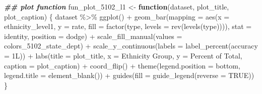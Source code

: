 \documentclass[
]{article}
\newenvironment{Shaded}{\begin{snugshade}}{\end{snugshade}}
\newcommand{\AttributeTok}[1]{\textcolor[rgb]{0.77,0.63,0.00}{#1}}
\newcommand{\ConstantTok}[1]{\textcolor[rgb]{0.00,0.00,0.00}{#1}}
\newcommand{\ControlFlowTok}[1]{\textcolor[rgb]{0.13,0.29,0.53}{\textbf{#1}}}
\newcommand{\DocumentationTok}[1]{\textcolor[rgb]{0.56,0.35,0.01}{\textbf{\textit{#1}}}}
\newcommand{\FunctionTok}[1]{\textcolor[rgb]{0.00,0.00,0.00}{#1}}
\newcommand{\NormalTok}[1]{#1}
\newcommand{\OtherTok}[1]{\textcolor[rgb]{0.56,0.35,0.01}{#1}}
\newcommand{\SpecialCharTok}[1]{\textcolor[rgb]{0.00,0.00,0.00}{#1}}
\newcommand{\StringTok}[1]{\textcolor[rgb]{0.31,0.60,0.02}{#1}}
\begin{document}
\begin{Shaded}
\begin{Highlighting}[]
\DocumentationTok{\#\# plot function}
\NormalTok{fun\_plot\_5102\_l1 }\OtherTok{\textless{}{-}} \ControlFlowTok{function}\NormalTok{(dataset, plot\_title, plot\_caption) \{}
\NormalTok{    dataset }\SpecialCharTok{\%\textgreater{}\%} 
        \FunctionTok{ggplot}\NormalTok{() }\SpecialCharTok{+}
        \FunctionTok{geom\_bar}\NormalTok{(}\AttributeTok{mapping =} \FunctionTok{aes}\NormalTok{(}\AttributeTok{x =}\NormalTok{ ethnicity\_level1, }
                               \AttributeTok{y =}\NormalTok{ rate, }
                               \AttributeTok{fill =} \FunctionTok{factor}\NormalTok{(type, }\AttributeTok{levels =} \FunctionTok{rev}\NormalTok{(}\FunctionTok{levels}\NormalTok{(type)))), }
                 \AttributeTok{stat =} \StringTok{\textquotesingle{}identity\textquotesingle{}}\NormalTok{, }
                 \AttributeTok{position =} \StringTok{\textquotesingle{}dodge\textquotesingle{}}\NormalTok{) }\SpecialCharTok{+}
        \FunctionTok{scale\_fill\_manual}\NormalTok{(}\AttributeTok{values =}\NormalTok{ colors\_5102\_state\_dept) }\SpecialCharTok{+}
        \FunctionTok{scale\_y\_continuous}\NormalTok{(}\AttributeTok{labels =} \FunctionTok{label\_percent}\NormalTok{(}\AttributeTok{accuracy =}\NormalTok{ 1L)) }\SpecialCharTok{+}
        \FunctionTok{labs}\NormalTok{(}\AttributeTok{title =}\NormalTok{ plot\_title,}
             \AttributeTok{x =} \StringTok{\textquotesingle{}Ethnicity Group\textquotesingle{}}\NormalTok{,}
             \AttributeTok{y =} \StringTok{\textquotesingle{}Percent of Total\textquotesingle{}}\NormalTok{, }
             \AttributeTok{caption =}\NormalTok{ plot\_caption) }\SpecialCharTok{+}
        \FunctionTok{coord\_flip}\NormalTok{() }\SpecialCharTok{+} 
        \FunctionTok{theme}\NormalTok{(}\AttributeTok{legend.position =} \StringTok{\textquotesingle{}bottom\textquotesingle{}}\NormalTok{, }
              \AttributeTok{legend.title =} \FunctionTok{element\_blank}\NormalTok{()) }\SpecialCharTok{+}
        \FunctionTok{guides}\NormalTok{(}\AttributeTok{fill =} \FunctionTok{guide\_legend}\NormalTok{(}\AttributeTok{reverse =} \ConstantTok{TRUE}\NormalTok{))}
\NormalTok{\}}


\end{Highlighting}
\end{Shaded}
\end{document}
